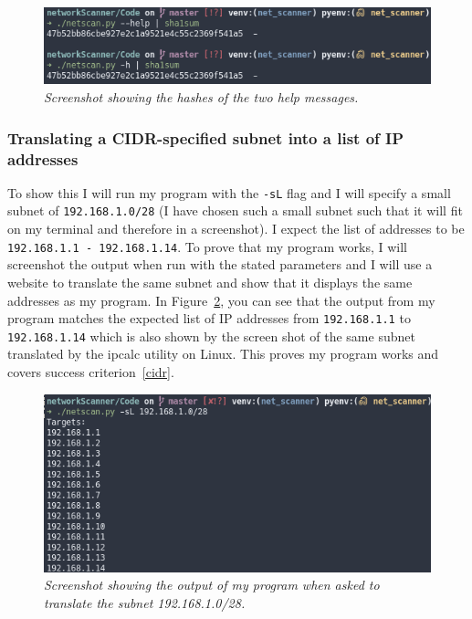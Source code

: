 \documentclass[titlepage]{article}
\let\Oldsubsubsection\subsubsection{}
\renewcommand{\subsubsection}{\FloatBarrier\Oldsubsubsection}
\begin{document}
\begin{figure}[H]
  \centering
  \includegraphics[width=\textwidth]{messagehashes.png}
  \caption{\textit{%
    Screenshot showing the hashes of the two help messages.
}}\label{messagehash}
\end{figure}

\subsubsection{Translating a CIDR-specified subnet into a list of IP addresses}\label{test:cidr}
To show this I will run my program with the \verb|-sL| flag and I will specify
a small subnet of \verb|192.168.1.0/28| (I have chosen such a small subnet
such that it will fit on my terminal and therefore in a screenshot).
I expect the list of addresses to be \verb|192.168.1.1 - 192.168.1.14|.
To prove that my program works,
I will screenshot the output when run with the stated parameters and I will use
a website to translate the same subnet and show
that it displays the same addresses as my program.
In Figure~\ref{cidrtest}, you can see that the output from my program matches
the expected list of IP addresses from \verb|192.168.1.1| to \verb|192.168.1.14|
which is also shown by the screen shot of the same subnet translated by
the ipcalc utility on Linux.
This proves my program works and covers success criterion~\ref{cidr}.

\begin{figure}[H]
  \centering
  \includegraphics[width=\textwidth]{iplist.png}
  \caption{\textit{%
    Screenshot showing the output of my program when asked to translate the subnet 192.168.1.0/28.
}}\label{cidrtest}
\end{figure}
\end{document}
